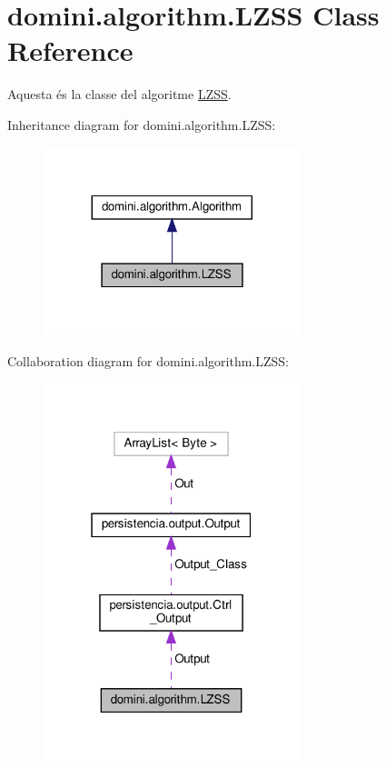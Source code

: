 \hypertarget{classdomini_1_1algorithm_1_1LZSS}{}\section{domini.\+algorithm.\+L\+Z\+SS Class Reference}
\label{classdomini_1_1algorithm_1_1LZSS}


Aquesta és la classe del algoritme \hyperlink{classdomini_1_1algorithm_1_1LZSS}{L\+Z\+SS}.  




Inheritance diagram for domini.\+algorithm.\+L\+Z\+SS\+:
\nopagebreak
\begin{figure}[H]
\begin{center}
\leavevmode
\includegraphics[width=212pt]{classdomini_1_1algorithm_1_1LZSS__inherit__graph}
\end{center}
\end{figure}


Collaboration diagram for domini.\+algorithm.\+L\+Z\+SS\+:\nopagebreak
\begin{figure}[H]
\begin{center}
\leavevmode
\includegraphics[width=211pt]{classdomini_1_1algorithm_1_1LZSS__coll__graph}
\end{center}
\end{figure}
